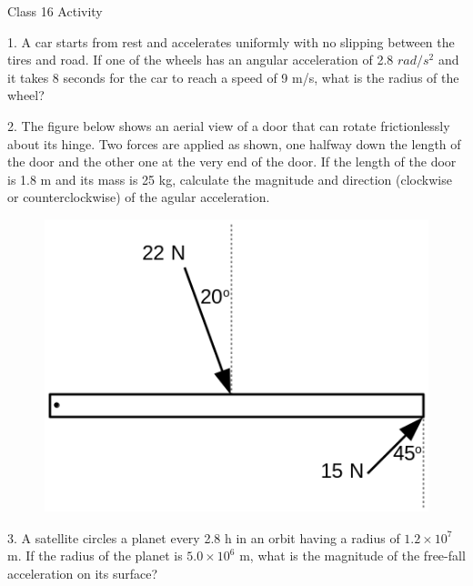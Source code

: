 \documentclass[12pt]{article}
\begin{document}
{\centering
\large Class 16 Activity \par
}
\hfill \break \vspace{-4mm}

1. A car starts from rest and accelerates uniformly with no slipping between the tires and road.
If one of the wheels has an angular acceleration of 2.8 $rad/s^2$ and it takes 8 seconds for the car to reach a speed of 9 m/s, what is the radius of the wheel?
\hfill \break

2. The figure below shows an aerial view of a door that can rotate frictionlessly about its hinge.
Two forces are applied as shown, one halfway down the length of the door and the other one at the very end of the door.
If the length of the door is 1.8 m and its mass is 25 kg, calculate the magnitude and direction (clockwise or counterclockwise) of the agular acceleration.
%
\begin{figure}[H]
\includegraphics[scale=0.50]{figures/torque-rod.png}
\end{figure}

3. A satellite circles a planet every 2.8 h in an orbit having a radius of $1.2 \times 10^7$ m.
If the radius of the planet is $5.0 \times 10^6$ m, what is the magnitude of the free-fall acceleration on its surface?
\hfill \break
\end{document}
